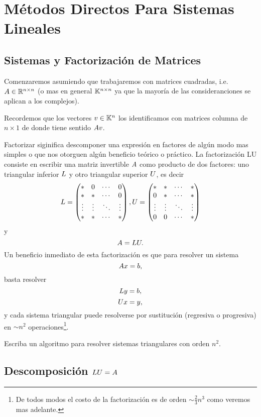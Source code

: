  
\chapter{Métodos Directos Para Sistemas Lineales}
\setcounter{equation}{0}

\section{Sistemas y Factorización de Matrices}

Comenzaremos asumiendo que trabajaremos con matrices cuadradas, i.e.  $\Ab\in \R^{n\times n}$ (o mas en general
$\mathbb K^{n\times n}$ ya que la mayoría de las consideranciones se aplican a los complejos).

Recordemos que los vectores $\vb\in \Kn$ los identificamos con matrices columna de $n\times 1$ de donde tiene sentido $\Ab\vb$.

Factorizar siginifica descomponer una expresión en factores de algún modo mas simples o que nos otorguen algún beneficio teórico o práctico. La factorización
LU consiste en escribir una matriz invertible $\Ab$ como producto de dos factores: uno triangular inferior $\Lb$ y otro triangular superior $\Ub$, es decir
$$
\Lb= \begin{pmatrix}
*& 0 & \cdots & 0 \\
* & * & \cdots & 0 \\
\vdots  & \vdots  & \ddots & \vdots  \\
* & * & \cdots & * 
\end{pmatrix}, 
\Ub= \begin{pmatrix}
*& * & \cdots & * \\
0 & * & \cdots & * \\
\vdots  & \vdots  & \ddots & \vdots  \\
0 & 0 & \cdots & * 
\end{pmatrix}
$$
y
$$
\Ab=\Lb\Ub.
$$
Un beneficio inmediato de esta factorización es que para  resolver un sistema
$$
\Ab\xb=\bb,
$$
basta resolver
$$
\Lb\yb=\bb,
$$
$$
\Ub\xb=\yb,
$$
y cada sistema triangular puede resolverse por sustitución (regresiva o progresiva) en $\sim n^2$ operaciones\footnote{De todos modos el costo de la factorización es de orden $\sim \frac23 n^3$ como veremos mas adelante.}.
\begin{ej} Escriba  un algoritmo para resolver sistemas triangulares con orden $n^2$.
\end{ej}

\section{Descomposición $\Lb\Ub=\Ab$}

